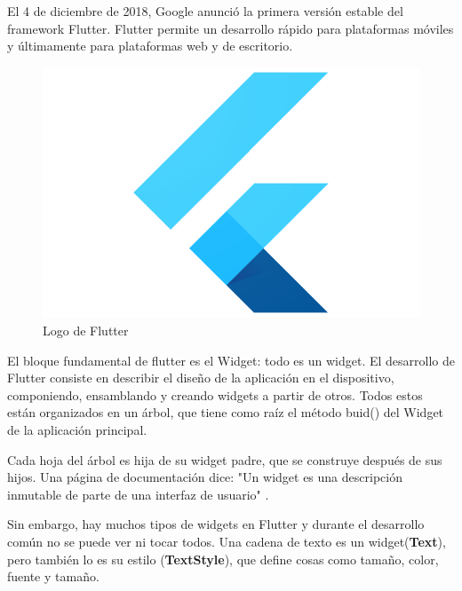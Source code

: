 El 4 de diciembre de 2018, Google anunció la primera versión estable del framework Flutter. Flutter permite un desarrollo rápido para plataformas móviles y últimamente para plataformas web y de escritorio. 
\begin{figure}[!htb]
    \centering
    \includegraphics[scale=0.3]{TT/img/analisis/flutterlogo.png}
    \caption{Logo de Flutter}
    \label{graphic:FlutterLogo}    
\end{figure}
El bloque fundamental de flutter es el Widget: todo es un widget. El desarrollo de Flutter consiste en describir el diseño de la aplicación en el dispositivo, componiendo, ensamblando y creando widgets a partir de otros. Todos estos están organizados en un árbol, que tiene como raíz el método buid() del Widget de la aplicación principal.

Cada hoja del árbol es hija de su widget padre, que se construye después de sus hijos. Una página de documentación dice: "Un widget es una descripción inmutable de parte de una interfaz de usuario" \cite{Flutter2020}.

Sin embargo, hay muchos tipos de widgets en Flutter y durante el desarrollo común no se puede ver ni tocar todos. Una cadena de texto es un widget(\textbf{Text}), pero también lo es su estilo (\textbf{TextStyle}), que define cosas como tamaño, color, fuente y tamaño. 

